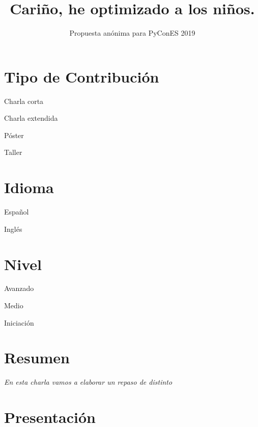 \documentclass[runningheads]{llncs}
\newcommand{\cmark}{\ding{51}}%
\newcommand{\done}{\rlap{$\square$}{\raisebox{2pt}{\large\hspace{1pt}\cmark}}%
\hspace{-2.5pt}}
\begin{document}
\pagestyle{headings}
\mainmatter


\title{Cariño, he optimizado a los niños.} %


\author{Propuesta an\'onima para PyConES 2019}

\maketitle

\section{Tipo de Contribuci\'on}

\begin{todolist}
  \item Charla corta
  \item [\done]Charla extendida
  \item P\'oster
  \item Taller
  \end{todolist}


\section{Idioma}
\begin{todolist}
  \item [\done]Espa\~nol
  \item Ingl\'es
\end{todolist}
\section{Nivel}

\begin{todolist}
  \item Avanzado
  \item [\done] Medio
  \item Iniciaci\'on
  \end{todolist}


\newpage

\section{Resumen}
\textit{En esta charla vamos a elaborar un repaso de distinto  }

\section{Presentaci\'on}
\end{document}
